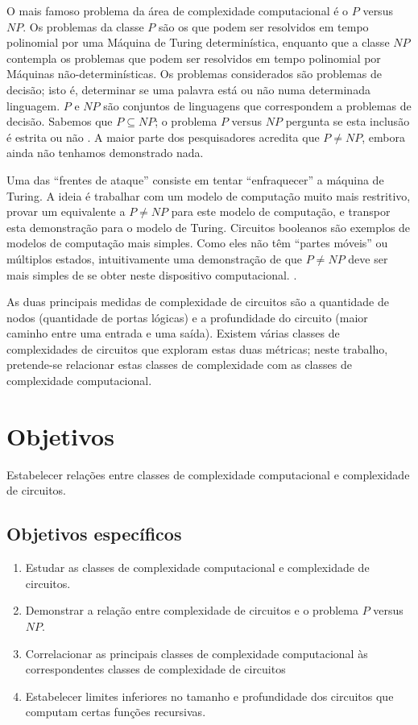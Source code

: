 \documentclass[12pt]{article}
\begin{document}
    O mais famoso problema da área de complexidade computacional é o $P$ versus $NP$.
    Os problemas da classe $P$ são os que podem ser resolvidos em tempo polinomial
    por uma Máquina de Turing determinística, enquanto que a classe $NP$ contempla
    os problemas que podem ser resolvidos em tempo polinomial por Máquinas
    não-determinísticas.
    Os problemas considerados são problemas de decisão; isto é, determinar se uma
    palavra está ou não numa determinada linguagem. $P$ e $NP$ são conjuntos de
    linguagens que correspondem a problemas de decisão. Sabemos que $P \subseteq NP$;
    o problema $P$ versus $NP$ pergunta se esta inclusão é estrita ou não \cite{Sipser2006}.
    A maior parte dos pesquisadores acredita que $P \neq NP$,
    embora ainda não tenhamos demonstrado nada.

    Uma das ``frentes de ataque'' consiste em tentar ``enfraquecer'' a máquina de Turing.
    A ideia é trabalhar com um modelo de computação muito mais restritivo,
    provar um equivalente a $P \neq NP$ para este modelo de computação,
    e transpor esta demonstração para o modelo de Turing.
    Circuitos booleanos são exemplos de modelos de computação mais simples.
    Como eles não têm ``partes móveis'' ou múltiplos estados,
    intuitivamente uma demonstração de que $P \neq NP$ deve ser
    mais simples de se obter neste dispositivo computacional. \cite{Hastad1987}.

    As duas principais medidas de complexidade de circuitos são a quantidade de
    nodos (quantidade de portas lógicas) e a profundidade do circuito
    (maior caminho entre uma entrada e uma saída).
    Existem várias classes de complexidades de circuitos
    que exploram estas duas métricas;
    neste trabalho, pretende-se relacionar estas classes de complexidade
    com as classes de complexidade computacional.

\section{Objetivos}

    Estabelecer relações entre classes de complexidade computacional
    e complexidade de circuitos.

\subsection{Objetivos específicos}

    \begin{enumerate}
        \item Estudar as classes de complexidade computacional
            e complexidade de circuitos.
        \item Demonstrar a relação entre complexidade de circuitos
            e o problema $P$ versus $NP$.
        \item Correlacionar as principais classes de complexidade computacional
            às correspondentes classes de complexidade de circuitos
        \item Estabelecer limites inferiores no tamanho e profundidade dos circuitos
            que computam certas funções recursivas.
    \end{enumerate}
\end{document}
